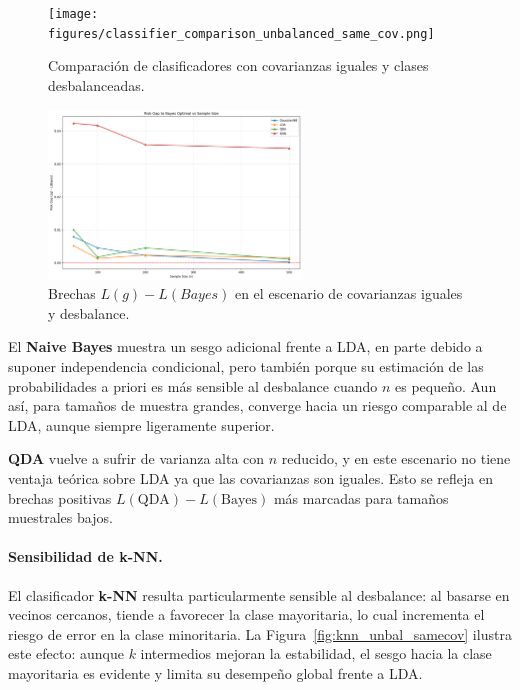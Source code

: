 \documentclass[10pt]{article}
\begin{document}
\begin{figure}[H]
    \centering
    \texttt{[image: figures/classifier\_comparison\_unbalanced\_same\_cov.png]}
    \caption{Comparación de clasificadores con covarianzas iguales y clases desbalanceadas.}
    \label{fig:risk_unbal_samecov}
\end{figure}

\begin{figure}[H]
    \centering
    \includegraphics[width=0.60\textwidth]{figures/risk_gaps.png}
    \caption{Brechas $L(g)-L(Bayes)$ en el escenario de covarianzas iguales y desbalance.}
    \label{fig:riskgap_unbal_samecov}
\end{figure}

El \textbf{Naive Bayes} muestra un sesgo adicional frente a LDA, en parte debido a suponer independencia condicional, 
pero también porque su estimación de las probabilidades a priori es más sensible al desbalance cuando $n$ es pequeño. 
Aun así, para tamaños de muestra grandes, converge hacia un riesgo comparable al de LDA, aunque siempre ligeramente superior.

\textbf{QDA} vuelve a sufrir de varianza alta con $n$ reducido, 
y en este escenario no tiene ventaja teórica sobre LDA ya que las covarianzas son iguales. 
Esto se refleja en brechas positivas $L(\text{QDA})-L(\text{Bayes})$ más marcadas para tamaños muestrales bajos.

\paragraph{Sensibilidad de k-NN.}
El clasificador \textbf{k-NN} resulta particularmente sensible al desbalance: 
al basarse en vecinos cercanos, tiende a favorecer la clase mayoritaria, 
lo cual incrementa el riesgo de error en la clase minoritaria. 
La Figura~\ref{fig:knn_unbal_samecov} ilustra este efecto: aunque $k$ intermedios mejoran la estabilidad, 
el sesgo hacia la clase mayoritaria es evidente y limita su desempeño global frente a LDA.
\end{document}
